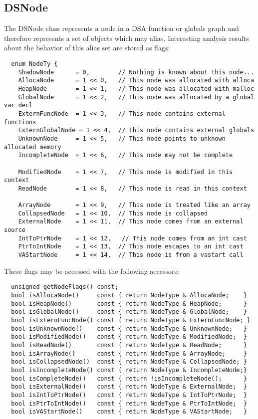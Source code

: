 \documentclass{article}
\begin{document}
\subsection{DSNode}

The DSNode class represents a node in a DSA function or globals graph
and therefore represents a set of objects which may alias.
Interesting analysis results about the behavior of this alias set are
stored as flags:
\begin{verbatim}
  enum NodeTy {
    ShadowNode      = 0,        // Nothing is known about this node...
    AllocaNode      = 1 << 0,   // This node was allocated with alloca
    HeapNode        = 1 << 1,   // This node was allocated with malloc
    GlobalNode      = 1 << 2,   // This node was allocated by a global var decl
    ExternFuncNode  = 1 << 3,   // This node contains external functions
    ExternGlobalNode = 1 << 4,  // This node contains external globals
    UnknownNode     = 1 << 5,   // This node points to unknown allocated memory
    IncompleteNode  = 1 << 6,   // This node may not be complete

    ModifiedNode    = 1 << 7,   // This node is modified in this context
    ReadNode        = 1 << 8,   // This node is read in this context

    ArrayNode       = 1 << 9,   // This node is treated like an array
    CollapsedNode   = 1 << 10,  // This node is collapsed
    ExternalNode    = 1 << 11,  // This node comes from an external source
    IntToPtrNode    = 1 << 12,   // This node comes from an int cast
    PtrToIntNode    = 1 << 13,  // This node escapes to an int cast
    VAStartNode     = 1 << 14,  // This node is from a vastart call
\end{verbatim}

These flags may be accessed with the following accessors:
\begin{verbatim}
  unsigned getNodeFlags() const;
  bool isAllocaNode()     const { return NodeType & AllocaNode;    }
  bool isHeapNode()       const { return NodeType & HeapNode;      }
  bool isGlobalNode()     const { return NodeType & GlobalNode;    }
  bool isExternFuncNode() const { return NodeType & ExternFuncNode; }
  bool isUnknownNode()    const { return NodeType & UnknownNode;   }
  bool isModifiedNode()   const { return NodeType & ModifiedNode;  }
  bool isReadNode()       const { return NodeType & ReadNode;      }
  bool isArrayNode()      const { return NodeType & ArrayNode;     }
  bool isCollapsedNode()  const { return NodeType & CollapsedNode; }
  bool isIncompleteNode() const { return NodeType & IncompleteNode;}
  bool isCompleteNode()   const { return !isIncompleteNode();      }
  bool isExternalNode()   const { return NodeType & ExternalNode;  }
  bool isIntToPtrNode()   const { return NodeType & IntToPtrNode;  }
  bool isPtrToIntNode()   const { return NodeType & PtrToIntNode;  }
  bool isVAStartNode()    const { return NodeType & VAStartNode;   }
\end{verbatim}
\end{document}
